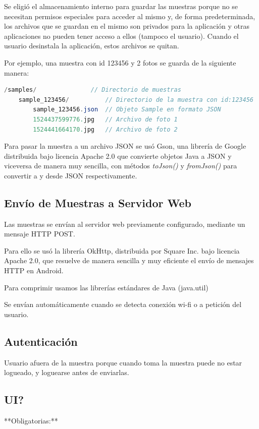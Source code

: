 Se eligió el almacenamiento interno para guardar las muestras porque no se necesitan permisos especiales para acceder al mismo y, de forma predeterminada, los archivos que se guardan en el mismo son privados para la aplicación y otras aplicaciones no pueden tener acceso a ellos (tampoco el usuario). Cuando el usuario desinstala la aplicación, estos archivos se quitan\cite{androidInternalStorage}.

Por ejemplo, una muestra con id 123456 y 2 fotos se guarda de la siguiente manera:
\begin{lstlisting}[language=Java, frame=tlb]
/samples/				// Directorio de muestras
	sample_123456/			// Directorio de la muestra con id:123456 
		sample_123456.json	// Objeto Sample en formato JSON
		1524437599776.jpg	// Archivo de foto 1
		1524441664170.jpg	// Archivo de foto 2
\end{lstlisting}

Para pasar la muestra a un archivo JSON se usó Gson\cite{gson}, una librería de Google distribuida bajo licencia Apache 2.0 que convierte objetos Java a JSON y viceversa de manera muy sencilla, con métodos \textit{toJson()} y \textit{fromJson()} para convertir a y desde JSON respectivamente.

\subsection{Envío de Muestras a Servidor Web}
Las muestras se envían al servidor web previamente configurado, mediante un mensaje HTTP POST.

Para ello se usó la librería OkHttp\cite{okhttp}, distribuida por Square Inc. bajo licencia Apache 2.0, que resuelve de manera sencilla y muy eficiente el envío de mensajes HTTP en Android.

Para comprimir usamos las librerías estándares de Java (java.util)

Se envían automáticamente cuando se detecta conexión wi-fi o a petición del usuario.

\subsection{Autenticación}
Usuario afuera de la muestra porque cuando toma la muestra puede no estar logueado, y loguearse antes de enviarlas.

\subsection{UI?}
**Obligatorias:**


